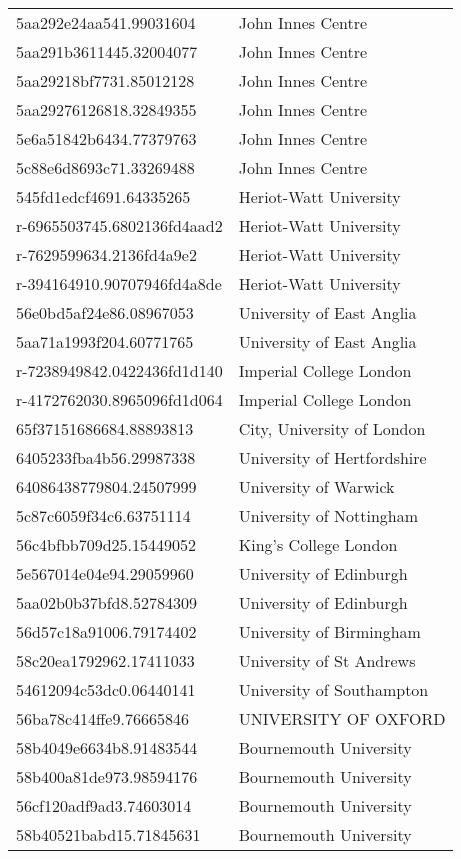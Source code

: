 \begin{tabular}{ll}
5aa292e24aa541.99031604 & John Innes Centre \\
5aa291b3611445.32004077 & John Innes Centre \\
5aa29218bf7731.85012128 & John Innes Centre \\
5aa29276126818.32849355 & John Innes Centre \\
5e6a51842b6434.77379763 & John Innes Centre \\
5c88e6d8693c71.33269488 & John Innes Centre \\
545fd1edcf4691.64335265 & Heriot-Watt University \\
r-6965503745.6802136fd4aad2 & Heriot-Watt University \\
r-7629599634.2136fd4a9e2 & Heriot-Watt University \\
r-394164910.90707946fd4a8de & Heriot-Watt University \\
56e0bd5af24e86.08967053 & University of East Anglia \\
5aa71a1993f204.60771765 & University of East Anglia \\
r-7238949842.0422436fd1d140 & Imperial College London \\
r-4172762030.8965096fd1d064 & Imperial College London \\
65f37151686684.88893813 & City, University of London \\
6405233fba4b56.29987338 & University of Hertfordshire \\
64086438779804.24507999 & University of Warwick \\
5c87c6059f34c6.63751114 & University of Nottingham \\
56c4bfbb709d25.15449052 & King's College London \\
5e567014e04e94.29059960 & University of Edinburgh \\
5aa02b0b37bfd8.52784309 & University of Edinburgh \\
56d57c18a91006.79174402 & University of Birmingham \\
58c20ea1792962.17411033 & University of St Andrews \\
54612094c53dc0.06440141 & University of Southampton \\
56ba78c414ffe9.76665846 & UNIVERSITY OF OXFORD \\
58b4049e6634b8.91483544 & Bournemouth University \\
58b400a81de973.98594176 & Bournemouth University \\
56cf120adf9ad3.74603014 & Bournemouth University \\
58b40521babd15.71845631 & Bournemouth University \\

\end{tabular}

